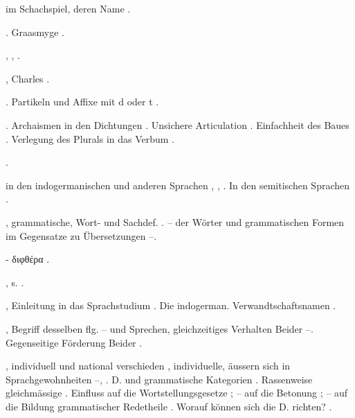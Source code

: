 \begin{register}
 im Schachspiel, deren Name \pageref{sp.268}.

. Graasmyge \pageref{sp.216}.

 \pageref{sp.160}, \pageref{sp.282}, \pageref{sp.307}.

, Charles \pageref{sp.15}.

 \pageref{sp.102}. Partikeln und Affixe mit d oder t \pageref{sp.153}.

. Archaismen in den Dichtungen \pageref{sp.107}. Unsichere Articulation \pageref{sp.194}.  Einfachheit des Baues \pageref{sp.349}. Verlegung des Plurals in das Verbum \pageref{sp.446}.

 \pageref{sp.315}.

 in den indogermanischen und anderen Sprachen \pageref{sp.352}, \pageref{sp.398}, \pageref{sp.400}. In den semitischen Sprachen \pageref{sp.420}.

, grammatische, Wort- und Sachdef. \pageref{sp.1}. – der Wörter und grammatischen Formen im Gegensatze zu Übersetzungen \pageref{sp.47}–\pageref{sp.48}.

 - διφθέρα \pageref{sp.264}.

, s. .

, Einleitung in das Sprachstudium \pageref{sp.171}\sed{, \pageref{sp.180}}. Die indogerman. Verwandtschaftsnamen \pageref{sp.294}.


, Begriff desselben \pageref{sp.6} flg. – und Sprechen, gleichzeitiges Verhalten Beider \pageref{sp.43}–\pageref{sp.44}. Gegenseitige Förderung Beider \pageref{sp.312}. 

, individuell und national verschieden \pageref{sp.44}, individuelle, äussern sich in Sprachgewohnheiten \pageref{sp.98}–\pageref{sp.99}, \pageref{sp.150}. D. und grammatische Kategorien \pageref{sp.253}. Rassenweise gleichmässige \pageref{sp.293}. Einfluss auf die Wortstellungsgesetze \pageref{sp.372}; – auf die Betonung \pageref{sp.376}; – auf die Bildung grammatischer Redetheile \pageref{sp.382}. Worauf können sich die D. richten? \pageref{sp.428}.




\end{register}
